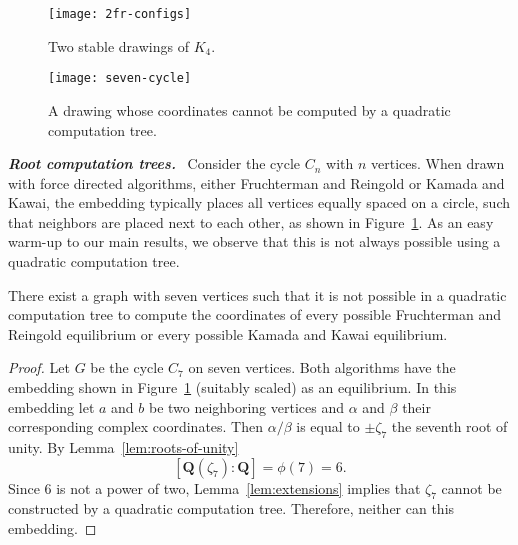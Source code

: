\documentclass[oribibl,10pt]{llncs}
\newcommand{\rationals}{\mathbf{Q}}
\newcommand{\Emph}[1]{\smallskip\textbf{\textit{#1}}~}
\begin{document}
\begin{figure}[tb]
\begin{minipage}[t]{0.4\textwidth} 
\centering
\texttt{[image: 2fr-configs]}
\caption{Two stable drawings of $K_4$.}
\label{fig:2fr-configs}
\end{minipage}\hfill
\begin{minipage}[t]{0.4\textwidth} 
\centering
\texttt{[image: seven-cycle]}
\caption{A drawing whose coordinates cannot be computed by a quadratic computation tree.}
\label{fig:seven-cycle}
\end{minipage}
\end{figure}

\Emph{Root computation trees.}
Consider the cycle $C_n$ with $n$ vertices. When drawn with force directed algorithms, either Fruchterman and Reingold or Kamada and Kawai, the embedding typically places all vertices equally spaced on a circle, such that neighbors are placed next to each other, as shown in Figure~\ref{fig:seven-cycle}. As an easy warm-up to our main results, we observe that this is not always possible using a quadratic computation tree.

\begin{theorem}\label{thm:force-quad}
There exist a graph with seven vertices such that it is not possible in a quadratic computation tree to compute the coordinates of every possible Fruchterman and Reingold equilibrium or
every possible Kamada and Kawai equilibrium.
\end{theorem}
\begin{proof}
Let $G$ be the cycle $C_7$ on seven vertices. Both algorithms have the embedding shown in Figure~\ref{fig:seven-cycle} (suitably scaled) as an equilibrium. In this embedding let $a$ and $b$ be two neighboring vertices and $\alpha$ and $\beta$ their corresponding complex coordinates. Then $\alpha / \beta$ is equal to $\pm \zeta_7$ the seventh root of unity. By Lemma~\ref{lem:roots-of-unity}
\[
[\rationals(\zeta_7) : \rationals] = \phi(7) = 6.
\]
Since $6$ is not a power of two, Lemma~\ref{lem:extensions} implies that $\zeta_7$ cannot be constructed by a quadratic computation tree. Therefore, neither can this embedding.
\end{proof}
\end{document}
